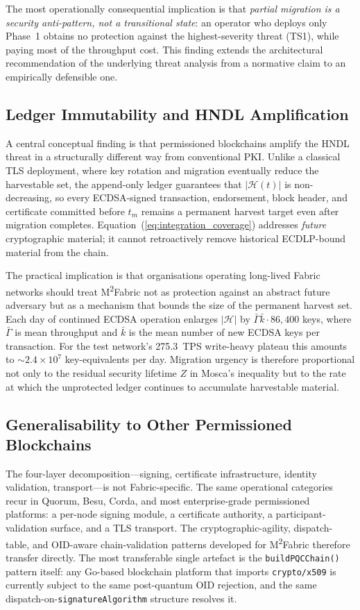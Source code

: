 \documentclass{ieeetj}
\newcommand{\mfabric}{M\textsuperscript{2}Fabric}
\begin{document}
The most operationally consequential implication is that
\emph{partial migration is a security anti-pattern, not a transitional
state}: an operator who deploys only Phase~1 obtains no protection against
the highest-severity threat (TS1), while paying most of the throughput
cost. This finding extends the architectural recommendation of the
underlying threat analysis from a normative claim to an empirically
defensible one.

\subsection{Ledger Immutability and HNDL Amplification}
\label{sec:disc_hndl}

A central conceptual finding is that permissioned blockchains amplify the
HNDL threat in a structurally different way from conventional PKI. Unlike a
classical TLS deployment, where key rotation and migration eventually
reduce the harvestable set, the append-only ledger
guarantees that $|\mathcal{H}(t)|$ is non-decreasing, so every
ECDSA-signed transaction, endorsement, block header, and certificate
committed before $t_m$ remains a permanent harvest target even after
migration completes. Equation~(\ref{eq:integration_coverage}) addresses
\emph{future} cryptographic material; it cannot retroactively remove
historical ECDLP-bound material from the chain.

The practical implication is that organisations operating long-lived Fabric
networks should treat \mfabric{} not as protection against an abstract future
adversary but as a mechanism that bounds the size of the permanent harvest
set. Each day of continued ECDSA operation enlarges $|\mathcal{H}|$ by
$\bar{\Gamma}\bar{k}\cdot 86{,}400$ keys, where $\bar{\Gamma}$ is mean
throughput and $\bar{k}$ is the mean number of new ECDSA keys per
transaction. For the test network's 275.3~TPS write-heavy plateau this
amounts to $\sim 2.4\times 10^{7}$ key-equivalents per day. Migration
urgency is therefore proportional not only to the residual security
lifetime $Z$ in Mosca's inequality but to the rate at which the
unprotected ledger continues to accumulate harvestable material.

\subsection{Generalisability to Other Permissioned Blockchains}
\label{sec:disc_general}

The four-layer decomposition---signing, certificate infrastructure,
identity validation, transport---is not Fabric-specific. The same
operational categories recur in Quorum, Besu, Corda, and most
enterprise-grade permissioned platforms: a per-node signing module, a
certificate authority, a participant-validation surface, and a TLS
transport. The cryptographic-agility, dispatch-table, and OID-aware
chain-validation patterns developed for \mfabric{} therefore transfer
directly. The most transferable single artefact is the
\texttt{buildPQCChain()} pattern itself: any Go-based blockchain platform
that imports \texttt{crypto/x509} is currently subject to the same
post-quantum OID rejection, and the same dispatch-on-\texttt{signatureAlgorithm}
structure resolves it.
\end{document}
